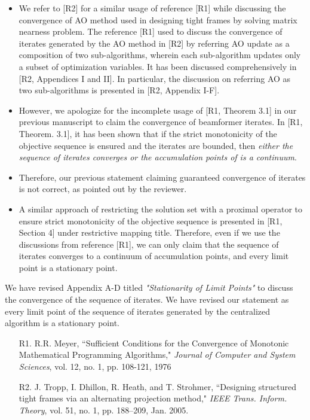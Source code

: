 \begin{enumerate}
	\begin{itemize}
		\item We refer to [R2] for a similar usage of reference [R1] while discussing the convergence of \ac{AO} method used in designing tight frames by solving matrix nearness problem. The reference [R1] used to discuss the convergence of iterates generated by the \ac{AO} method in [R2] by referring \ac{AO} update as a composition of two sub-algorithms, wherein each sub-algorithm updates only a subset of optimization variables. It has been discussed comprehensively in [R2, Appendices I and II]. In particular, the discussion on referring \ac{AO} as two sub-algorithms is presented in [R2, Appendix I-F].
		\item However, we apologize for the incomplete usage of [R1, Theorem 3.1] in our previous manuscript to claim the convergence of beamformer iterates. In [R1, Theorem. 3.1], it has been shown that if the strict monotonicity of the objective sequence is ensured and the iterates are bounded, then \textit{either the sequence of iterates converges or the accumulation points of  is a continuum}.
		\item Therefore, our previous statement claiming guaranteed convergence of iterates is not correct, as pointed out by the reviewer. 
		\item A similar approach of restricting the solution set with a proximal operator to ensure strict monotonicity of the objective sequence is presented in [R1, Section 4] under restrictive mapping title. Therefore, even if we use the discussions from reference [R1], we can only claim that the sequence of iterates  converges to a continuum of accumulation points, and every limit point is a stationary point.
	\end{itemize}
	
	We have revised Appendix A-D titled \textit{"Stationarity of Limit Points"} to discuss the convergence of the sequence of iterates. We have revised our statement as every limit point of the sequence of iterates generated by the centralized algorithm is a stationary point.
	
	\vspace{1eM}
	\begin{itemize}		
		\item[R1.] R.R. Meyer, ``Sufficient Conditions for the Convergence of Monotonic Mathematical Programming Algorithms," \emph{Journal of Computer and System Sciences}, vol. 12, no. 1, pp. 108-121, 1976
		\item[R2.] J. Tropp, I. Dhillon, R. Heath, and T. Strohmer, ``Designing structured tight frames via an alternating projection method," \emph{IEEE Trans. Inform. Theory}, vol. 51, no. 1, pp. 188–209, Jan. 2005.
	\end{itemize}
	
\end{enumerate}